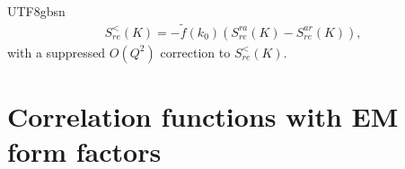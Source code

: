 \documentclass[11pt]{article}\def\baselinestretch{1.4}
\begin{document}
\begin{CJK}{UTF8}{gbsn}
\begin{align}
S_{re}^<(K)=-\tilde{f}(k_0)(S_{re}^{ra}(K)-S_{re}^{ar}(K)),
\end{align}
with a suppressed $O(Q^2)$ correction to $S_{re}^<(K)$.


\section{Correlation functions with EM form factors}\label{sec_app_C}


\end{CJK}
\end{document}
